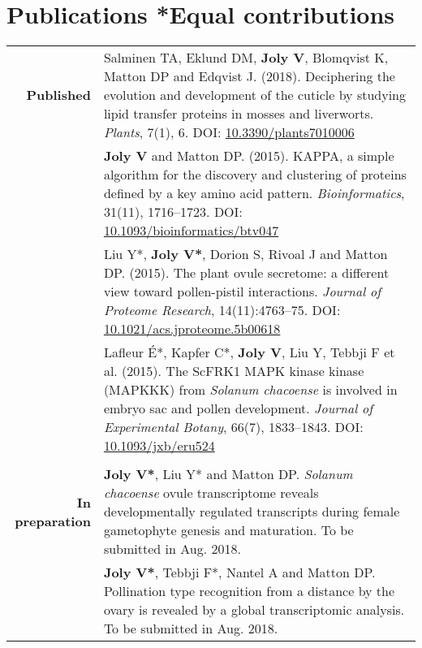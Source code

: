 \documentclass[letterpaper,10pt]{article}
\begin{document}
\section[Publications]{Publications \hfill \small{*Equal contributions}}
\begin{tabular}{r|p{13.8cm}}

\textbf{Published}

& Salminen TA, Eklund DM, \textbf{Joly V}, Blomqvist K, Matton DP
  and Edqvist J. (2018).
  Deciphering the evolution and development of the cuticle by studying lipid
  transfer proteins in mosses and liverworts.
  \emph{Plants}, 7(1), 6.
  DOI: \href{http://doi.org/10.3390/plants7010006}{10.3390/plants7010006}
  \vspace{3mm} \\

& \textbf{Joly V} and Matton DP. (2015).
  KAPPA, a simple algorithm for the discovery and clustering of proteins defined by
  a key amino acid pattern.
  \emph{Bioinformatics}, 31(11), 1716--1723.
  DOI: \href{http://doi.org/10.1093/bioinformatics/btv047}
  {10.1093/bioinformatics/btv047}
  \vspace{3mm} \\

& Liu Y*, \textbf{Joly V*}, Dorion S, Rivoal J and Matton DP. (2015).
  The plant ovule secretome: a different view toward pollen-pistil interactions.
  \emph{Journal of Proteome Research}, 14(11):4763--75.
  DOI: \href{http://doi.org/10.1021/acs.jproteome.5b00618}
  {10.1021/acs.jproteome.5b00618}
  \vspace{3mm} \\

& Lafleur É*, Kapfer C*, \textbf{Joly V}, Liu Y, Tebbji F et al. (2015).
  The ScFRK1 MAPK kinase kinase (MAPKKK) from \emph{Solanum chacoense} is
  involved in embryo sac and pollen development.
  \emph{Journal of Experimental Botany}, 66(7), 1833--1843.
  DOI: \href{http://doi.org/10.1093/jxb/eru524}{10.1093/jxb/eru524}
  \\

\multicolumn{2}{c}{} \\

\textbf{In preparation}

& \textbf{Joly V*}, Liu Y* and Matton DP.
  \emph{Solanum chacoense} ovule transcriptome reveals developmentally regulated
  transcripts during female gametophyte genesis and maturation.
  To be submitted in Aug. 2018.
  \vspace{3mm} \\

& \textbf{Joly V*}, Tebbji F*, Nantel A and Matton DP.
  Pollination type recognition from a distance by the ovary is revealed by a
  global transcriptomic analysis.
  To be submitted in Aug. 2018.
  \\

\end{tabular}
\end{document}
